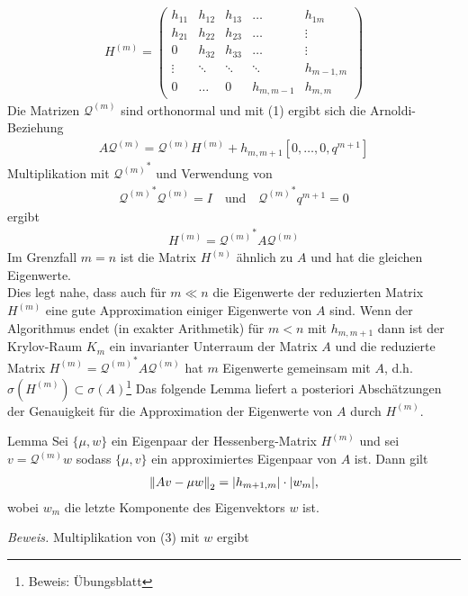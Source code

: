 \begin{align*}H^{(m)} = \begin{pmatrix}
  h_{11} & h_{12} & h_{13} & \dots & h_{1m} \\
  h_{21} & h_{22} & h_{23} & \dots & \vdots \\
  0 & h_{32} & h_{33} & \dots & \vdots \\
  \vdots & \ddots &  \ddots &   \ddots &  h_{m-1,m} \\
  0 &\dots & 0 & h_{m,m-1} & h_{m,m}
\end{pmatrix}\end{align*}
Die Matrizen $\mathcal{Q}^{(m)}$ sind orthonormal und mit (1) ergibt sich die Arnoldi-Beziehung 
\begin{align*}A\mathcal{Q}^{(m)} = \mathcal{Q}^{(m)} H^{(m)} + h_{m,m+1}[0,\dots,0,q^{m+1}]\tag{3}\end{align*}
Multiplikation mit ${\mathcal{Q}^{(m)}}^*$  und Verwendung von 
\begin{align*}{\mathcal{Q}^{(m)}}^* \mathcal{Q}^{(m)} = I \quad \text{und}\quad {\mathcal{Q}^{(m)}}^* q^{m+1}=0\end{align*}
ergibt 
\begin{align*}H^{(m)} = {\mathcal{Q}^{(m)}}^* A \mathcal{Q}^{(m)}\end{align*}
Im Grenzfall $m=n$ ist die Matrix $H^{(n)}$ ähnlich zu $A$ und hat die gleichen Eigenwerte. \\
Dies legt nahe, dass auch für $m\ll n$ die Eigenwerte der reduzierten Matrix $H^{(m)}$ eine gute Approximation 
einiger Eigenwerte von $A$ sind. Wenn der Algorithmus endet (in exakter Arithmetik) für $m<n$ mit $h_{m,m+1}$ dann
ist der Krylov-Raum $K_m$ ein invarianter Unterraum der Matrix $A$ und die reduzierte Matrix $H^{(m)} = 
{\mathcal{Q}^{(m)}}^* A \mathcal{Q}^{(m)}$ hat $m$ Eigenwerte gemeinsam mit $A$, d.h. $\sigma(H^{(m)})\subset \sigma(A)$\footnote{Beweis: Übungsblatt}
Das folgende Lemma liefert a posteriori Abschätzungen der Genauigkeit für die Approximation der Eigenwerte von $A$ durch 
$H^{(m)}$.
\begin{thmbox}{Lemma}
  Sei $\{\mu,w\}$ ein Eigenpaar der Hessenberg-Matrix $H^{(m)}$ und sei $v=\mathcal{Q}^{(m)}w$ sodass $\{\mu,v\}$ ein 
  approximiertes Eigenpaar von $A$ ist. Dann gilt
  \begin{align*}\vertn{2}{Av-\mu w}_2 = |h_{m+1,m}|\cdot |w_m|,\end{align*} 
  wobei $w_m$ die letzte Komponente des Eigenvektors $w$ ist.
\end{thmbox}
\textit{Beweis.} Multiplikation von (3) mit $w$ ergibt 
